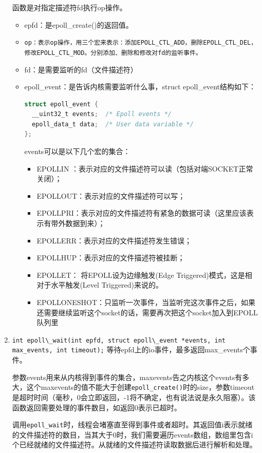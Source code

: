 \documentclass[format=final, language=chinese, degree=bachelor]{hustthesis}
\begin{document}
\begin{enumerate}
函数是对指定描述符fd执行op操作。
	\begin{itemize}
		\item epfd：是epoll\_create()的返回值。\label{item:2}
		\item \verb|op：表示op操作，用三个宏来表示：添加EPOLL_CTL_ADD，删除EPOLL_CTL_DEL，修改EPOLL_CTL_MOD。分别添加、删除和修改对fd的监听事件。|
		\item fd：是需要监听的fd（文件描述符）
		\item epoll\_event：是告诉内核需要监听什么事，struct epoll\_event结构如下：
		\begin{lstlisting}[language=c]
struct epoll_event {
  __uint32_t events;  /* Epoll events */
  epoll_data_t data;  /* User data variable */
};
		\end{lstlisting}
	events可以是以下几个宏的集合：
		\begin{itemize}
			\item EPOLLIN ：表示对应的文件描述符可以读（包括对端SOCKET正常关闭）；\label{item:3}
			\item EPOLLOUT：表示对应的文件描述符可以写；
			\item EPOLLPRI：表示对应的文件描述符有紧急的数据可读（这里应该表示有带外数据到来）；
			\item EPOLLERR：表示对应的文件描述符发生错误；
			\item EPOLLHUP：表示对应的文件描述符被挂断；
			\item EPOLLET： 将EPOLL设为边缘触发(Edge Triggered)模式，这是相对于水平触发(Level Triggered)来说的。
			\item EPOLLONESHOT：只监听一次事件，当监听完这次事件之后，如果还需要继续监听这个socket的话，需要再次把这个socket加入到EPOLL队列里
		\end{itemize}
	\end{itemize}
\item \lstinline {int epoll\_wait(int epfd, struct epoll\_event *events, int max_events, int timeout);}
等待epfd上的io事件，最多返回max\_events个事件。

参数events用来从内核得到事件的集合，maxevents告之内核这个events有多大，这个maxevents的值不能大于创建\verb|epoll_create()|时的size，参数timeout是超时时间（毫秒，0会立即返回，-1将不确定，也有说法说是永久阻塞）。该函数返回需要处理的事件数目，如返回0表示已超时。

调用\verb|epoll_wait|时，线程会堵塞直至得到事件或者超时。其返回值i表示就绪的文件描述符的数目，当其大于0时，我们需要遍历events数组，数组里包含i个已经就绪的文件描述符。从就绪的文件描述符读取数据后进行解析和处理。
\end{enumerate}
\end{document}

